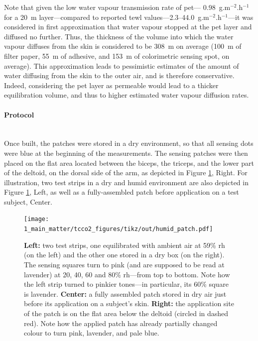 %

Note that given the low water vapour transmission rate of \gls{pet}---\ie{} 0.98~g.m$^{-2}$.h$^{-1}$ for a 20~{\textmu}m layer\cite{tock1983}---compared to reported \gls{tewl} values---2.3--44.0~g.m$^{-2}$.h$^{-1}$\cite{kottner2013, akdeniz2018}---it was considered in first approximation that water vapour stopped at the \gls{pet} layer and diffused no further. Thus, the thickness of the volume into which the water vapour diffuses from the skin is considered to be 308~{\textmu}m on average (100~{\textmu}m of filter paper, 55~{\textmu}m of adhesive, and 153~{\textmu}m of colorimetric sensing spot, on average). This approximation leads to pessimistic estimates of the amount of water diffusing from the skin to the outer air, and is therefore conservative. Indeed, considering the \gls{pet} layer as permeable would lead to a thicker equilibration volume, and thus to higher estimated water vapour diffusion rates.

\paragraph{Protocol}\mbox{}\\

Once built, the patches were stored in a dry environment, so that all sensing dots were blue at the beginning of the measurements. The sensing patches were then placed on the flat area located between the biceps, the triceps, and the lower part of the deltoid, on the dorsal side of the arm, as depicted in Figure \ref{fig:tcco2:patch_protoc}, Right. For illustration, two test strips in a dry and humid environment are also depicted in Figure \ref{fig:tcco2:patch_protoc}, Left, as well as a fully-assembled patch before application on a test subject, Center.

\begin{figure}
	\centering
	\texttt{[image: 1\_main\_matter/tcco2\_figures/tikz/out/humid\_patch.pdf]}
	\caption[Colorimetric humidity sensing patch pictures.]{\textbf{Left:} two test strips, one equilibrated with ambient air at 59\% \gls{rh} (on the left) and the other one stored in a dry box (on the right). The sensing squares turn to pink (and are supposed to be read at lavender) at 20, 40, 60 and 80\% \gls{rh}---from top to bottom. Note how the left strip turned to pinkier tones---in particular, its 60\% square is lavender. \textbf{Center:} a fully assembled patch stored in dry air just before its application on a subject's skin. \textbf{Right:} the application site of the patch is on the flat area below the deltoid (circled in dashed red). Note how the applied patch has already partially changed colour to turn pink, lavender, and pale blue.}
	\label{fig:tcco2:patch_protoc}
\end{figure}


